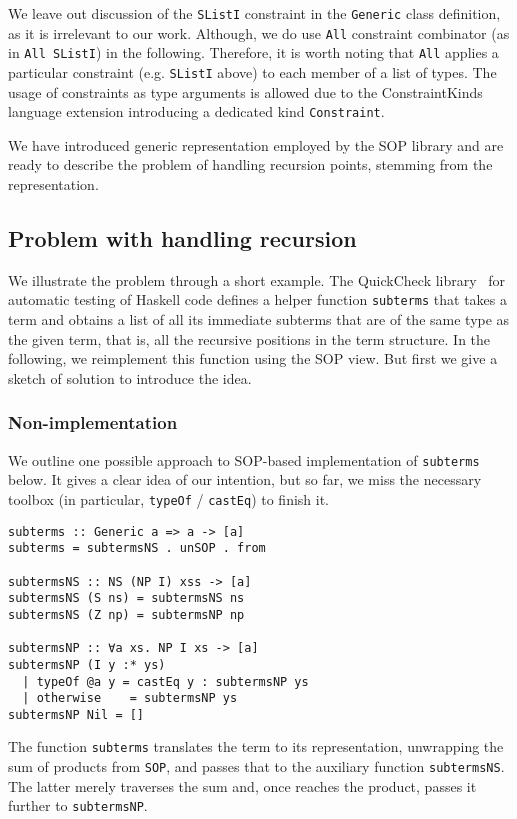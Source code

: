 \documentclass[runningheads]{llncs}
\newcommand{\K}[1]{\lstinline[style=fancy]{#1}}
\begin{document}
We leave out discussion of the \K{SListI} constraint in the \K{Generic} class definition, as it is irrelevant to our work. Although, we do use \K{All} constraint combinator (as in \K{All SListI}) in the following. Therefore, it is worth noting that \K{All} applies a particular constraint (e.g. \K{SListI} above) to each member of a list of types. The usage of constraints as type arguments is allowed due to the \textsf{ConstraintKinds} language extension introducing a dedicated kind \K{Constraint}.

We have introduced generic representation employed by the SOP library and are ready to describe the problem of handling recursion points, stemming from the representation. 

\subsection{Problem with handling recursion}
\label{subsec:recursion-problem}

We illustrate the problem through a short example. The \textsf{QuickCheck} library~\cite{Claessen2011} for automatic testing of Haskell code defines a helper function \K{subterms} that takes a term and obtains a list of all its immediate subterms that are of the same type as the given term, that is, all the recursive positions in the term structure. In the following, we reimplement this function using the SOP view. But first we give a sketch of solution to introduce the idea.

\subsubsection{Non-implementation}

We outline one possible approach to SOP-based implementation of \K{subterms} below. It gives a clear idea of our intention, but so far, we miss the necessary toolbox (in particular, \K{typeOf} / \K{castEq}) to finish it.
\begin{lstlisting}[style=fancy]
subterms :: Generic a => a -> [a]
subterms = subtermsNS . unSOP . from

subtermsNS :: NS (NP I) xss -> [a]
subtermsNS (S ns) = subtermsNS ns
subtermsNS (Z np) = subtermsNP np

subtermsNP :: ∀a xs. NP I xs -> [a]
subtermsNP (I y :* ys)
  | typeOf @a y = castEq y : subtermsNP ys
  | otherwise    = subtermsNP ys
subtermsNP Nil = []
\end{lstlisting}
The function \K{subterms} translates the term to its representation, unwrapping the sum of products from \K{SOP}, and passes that to the auxiliary function \K{subtermsNS}. The latter merely traverses the sum and, once reaches the product,  passes it further to \K{subtermsNP}.
\end{document}
